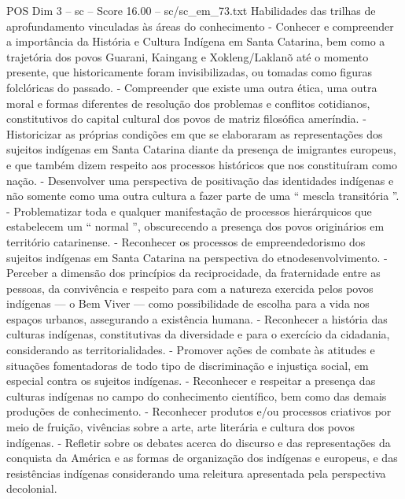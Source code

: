 \begin{textsample}{POS Dim 3 – sc – Score 16.00 – sc/sc\_em\_73.txt}
Habilidades das trilhas de aprofundamento vinculadas às áreas do conhecimento - Conhecer e compreender a importância da História e Cultura Indígena em Santa Catarina, bem como a trajetória dos povos Guarani, Kaingang e Xokleng/Laklanõ até o momento presente, que historicamente foram invisibilizadas, ou tomadas como figuras folclóricas do passado. - Compreender que existe uma outra ética, uma outra moral e formas diferentes de resolução dos problemas e conflitos cotidianos, constitutivos do capital cultural dos povos de matriz filosófica ameríndia. - Historicizar as próprias condições em que se elaboraram as representações dos sujeitos indígenas em Santa Catarina diante da presença de imigrantes europeus, e que também dizem respeito aos processos históricos que nos constituíram como nação. - Desenvolver uma perspectiva de positivação das identidades indígenas e não somente como uma outra cultura a fazer parte de uma “ mescla transitória ”. - Problematizar toda e qualquer manifestação de processos hierárquicos que estabelecem um “ normal ”, obscurecendo a presença dos povos originários em território catarinense. - Reconhecer os processos de empreendedorismo dos sujeitos indígenas em Santa Catarina na perspectiva do etnodesenvolvimento. - Perceber a dimensão dos princípios da reciprocidade, da fraternidade entre as pessoas, da convivência e respeito para com a natureza exercida pelos povos indígenas — o Bem Viver — como possibilidade de escolha para a vida nos espaços urbanos, assegurando a existência humana. - Reconhecer a história das culturas indígenas, constitutivas da diversidade e para o exercício da cidadania, considerando as territorialidades. - Promover ações de combate às atitudes e situações fomentadoras de todo tipo de discriminação e injustiça social, em especial contra os sujeitos indígenas. - Reconhecer e respeitar a presença das culturas indígenas no campo do conhecimento científico, bem como das demais produções de conhecimento. - Reconhecer produtos e/ou processos criativos por meio de fruição, vivências sobre a arte, arte literária e cultura dos povos indígenas. - Refletir sobre os debates acerca do discurso e das representações da conquista da América e as formas de organização dos indígenas e europeus, e das resistências indígenas considerando uma releitura apresentada pela perspectiva decolonial.

\end{textsample}
